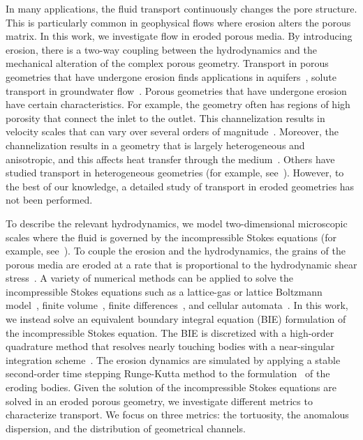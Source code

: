 \documentclass[preprint, 10pt]{elsarticle}
\begin{document}
In many applications, the fluid transport continuously changes the pore
structure.  This is particularly common in geophysical flows where
erosion alters the porous matrix.  In this work, we investigate flow in
eroded porous media.  By introducing erosion, there is a two-way
coupling between the hydrodynamics and the mechanical alteration of the
complex porous geometry.  Transport in porous geometries that have
undergone erosion finds applications in aquifers~\cite{cve-che-wen1996,
sud1986}, solute transport in groundwater flow~\cite{dag1987,
kon-bre1978}.  Porous geometries that have undergone erosion have
certain characteristics.  For example, the geometry often has regions of
high porosity that connect the inlet to the outlet.  This channelization
results in velocity scales that can vary over several orders of
magnitude~\cite{all-hea-lab-rei2002}.  Moreover, the channelization
results in a geometry that is largely heterogeneous and anisotropic, and
this affects heat transfer through the medium~\cite{nil-sto1990,
ree-sto1995}.  Others have studied transport in heterogeneous geometries
(for example, see~\cite{mil-chr-imh-mcb-ped1998, ber-sch-sil2000,
hak-com-den2019, suo-liu-gan2019, cus-hu-den1995, cve-che-wen1996,
leb-ded-dav-bou2007, knu-car2005, bel-sal-rin1992}). However, to the
best of our knowledge, a detailed study of transport in eroded
geometries has not been performed.

To describe the relevant hydrodynamics, we model two-dimensional
microscopic scales where the fluid is governed by the incompressible
Stokes equations (for example, see~\cite{hym-den-hag-kan2019,
den-ica-hid2018, bar-mar-vee-zha2018}).  To couple the erosion and the
hydrodynamics, the grains of the porous media are eroded at a rate that
is proportional to the hydrodynamic shear stress~\cite{wan-fel2004,
ris-moo-chi-she-zha2012, qua-moo2018, par-izu2000}.  A variety of
numerical methods can be applied to solve the incompressible Stokes
equations such as a lattice-gas or lattice Boltzmann
model~\cite{kop-kat-tim1996, dar-mcc1998}, finite
volume~\cite{suo-liu-gan2019, den-ica-hid2018, sie-ili-pri-riv-gua2019},
finite differences~\cite{leb-ded-dav-bou2007, knu-car2005}, and cellular
automata~\cite{rot1988}. In this work, we instead solve an equivalent
boundary integral equation (BIE) formulation of the incompressible
Stokes equation.  The BIE is discretized with a high-order quadrature
method that resolves nearly touching bodies with a near-singular
integration scheme~\cite{bar-wu-vee2015}.  The erosion dynamics are
simulated by applying a stable second-order time stepping Runge-Kutta
method to the {\thL} formulation~\cite{hou-low-she1994} of the eroding
bodies.  Given the solution of the incompressible Stokes equations are
solved in an eroded porous geometry, we investigate different metrics to
characterize transport.  We focus on three metrics: the tortuosity, the
anomalous dispersion, and the distribution of geometrical channels.  
\end{document}
